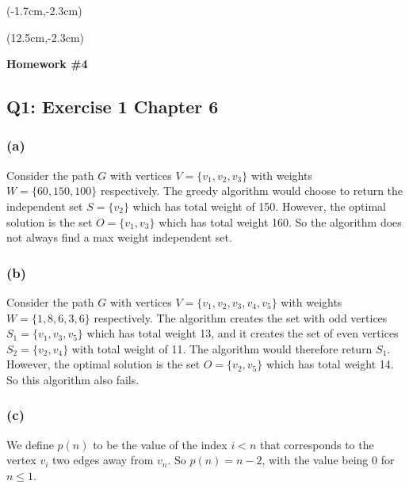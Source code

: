 \documentclass[12pt, oneside]{article}
\begin{document}
\begin{textblock*}{4cm}(-1.7cm,-2.3cm)
\end{textblock*}

\begin{textblock*}{8cm}(12.5cm,-2.3cm)
\end{textblock*}


\vspace{1cm}

\makeatletter
\setlength{\@fptop}{0pt}
\makeatother

\begin{center}
\textbf{\Large Homework \#4}
\end{center}


\subsection*{Q1: Exercise 1 Chapter 6}
\subsubsection*{(a)}
Consider the path $G$ with vertices $V=\{v_1,v_2,v_3\}$ with weights $W=\{60,150,100\}$ respectively. The greedy algorithm would choose to return the independent set $S=\{v_2\}$ which has total weight of 150. However, the optimal solution is the set $O=\{v_1,v_3\}$ which has total weight 160. So the algorithm does not always find a max weight independent set.\\

\subsubsection*{(b)}
Consider the path $G$ with vertices $V=\{v_1,v_2,v_3,v_4,v_5\}$ with weights $W=\{1,8,6,3,6\}$ respectively. The algorithm creates the set with odd vertices $S_1=\{v_1,v_3,v_5\}$ which has total weight 13, and it creates the set of even vertices $S_2=\{v_2,v_4\}$ with total weight of 11. The algorithm would therefore return $S_1$. However, the optimal solution is the set $O=\{v_2,v_5\}$ which has total weight 14. So this algorithm also fails.\\

\subsubsection*{(c)}
We define $p(n)$ to be the value of the index $i < n$ that corresponds to the vertex $v_i$ two edges away from $v_n$. So $p(n) = n-2$, with the value being 0 for $n \leq 1$.
\end{document}
